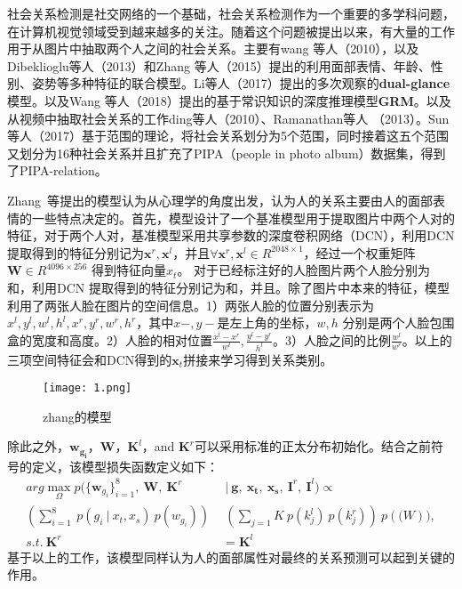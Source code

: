 社会关系检测是社交网络的一个基础\cite{li2015celebritynet}，社会关系检测作为一个重要的多学科问题，在计算机视觉领域受到越来越多的关注。随着这个问题被提出以来，有大量的工作用于从图片中抽取两个人之间的社会关系。主要有wang 等人（2010）\cite{wang2010seeing}，以及Dibeklioglu等人（2013）\cite{dibeklioglu2013like}和Zhang 等人（2015）\cite{zhang2015learning}提出的利用面部表情、年龄、性别、姿势等多种特征的联合模型。Li等人（2017）\cite{li2017dual-glance}提出的多次观察的\textbf{dual-glance}模型。以及Wang 等人（2018）\cite{wang2018deep}提出的基于常识知识的深度推理模型\textbf{GRM}。以及从视频中抽取社会关系的工作ding等人（2010）\cite{ding2010learning}、Ramanathan等人 （2013）\cite{ramanathan2013social}。Sun等人（2017）\cite{sun2017a}基于范围的理论，将社会关系划分为5个范围，同时接着这五个范围又划分为16种社会关系并且扩充了PIPA（people in photo album）数据集\cite{zhang2015beyond}，得到了PIPA-relation。

Zhang~等\cite{zhang2015learning}提出的模型认为从心理学的角度出发，认为人的关系主要由人的面部表情的一些特点决定的。首先，模型设计了一个基准模型用于提取图片中两个人对的特征，对于两个人对，基准模型采用共享参数的深度卷积网络（DCN），利用DCN提取得到的特征分别记为$\mathbf{x}^r,\mathbf{x}^l$，并且$\forall \mathbf{x}^r,\mathbf{x}^l \in R^{2048 \times 1}$，经过一个权重矩阵$\mathbf{W} \in R^{4096 \times 256}$ 得到特征向量$x_t$。 对于已经标注好的人脸图片两个人脸分别为和，利用DCN 提取得到的特征分别记为和，并且。除了图片中本来的特征，模型利用了两张人脸在图片的空间信息。1）两张人脸的位置分别表示为${x^l,y^l,w^l,h^l,x^r,y^r,w^r,h^r}$，其中$x-,y-$是左上角的坐标，$w,h$ 分别是两个人脸包围盒的宽度和高度。2）人脸的相对位置$\frac{x^l-x^r}{w^l},\frac{y^l-y^r}{h^l}$。3）人脸之间的比例$\frac{w^l}{w^r}$。以上的三项空间特征会和DCN得到的$\mathbf{x}_t$拼接来学习得到关系类别。
\begin{figure}[htpb]
	\centering
	\texttt{[image: 1.png]}
    \caption{zhang的模型}
	\vspace*{-3.5mm}
	\label{fig:model_zhang}
\end{figure}
除此之外，$\mathbf{w_{g_{i}}}$，$\mathbf{W}$，$\mathbf{K}^l$，and $\mathbf{K}^r$可以采用标准的正太分布初始化。结合之前符号的定义，该模型损失函数定义如下：
\begin{equation}
\begin{split}
     arg\max \limits_{\Omega} p(\{\mathbf{w}_{g_{i}}\}_{i=1}^8, ~\mathbf{W}, ~\mathbf{K}^r & ~|~ \mathbf{g},~\mathbf{x_t},~\mathbf{x_s},~\mathbf{I}^r,~\mathbf{I}^l) \propto \\
     (\sum_{i=1}^{8}~p(g_i~|~x_t,x_s)~p(w_{g_i}))~ & ~(\sum_{j=1}{K}~p(k_j^l)~p(k_j^r))~p(\mathbf(W)), \\
     s.t. ~\mathbf{K}^r &= \mathbf{K}^l
\end{split}
\end{equation}
基于以上的工作，该模型同样认为人的面部属性对最终的关系预测可以起到关键的作用。

